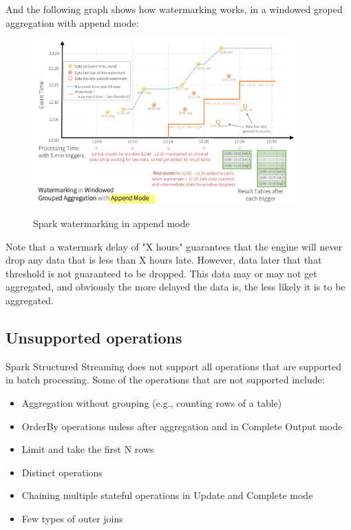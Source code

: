 And the following graph shows how watermarking works, in a windowed groped aggregation with append mode:

\begin{figure}[H]
    \centering
    \includegraphics[width=0.9\textwidth]{figures/spark_watermark_append.png}
    \label{fig:spark_watermark_append}
    \caption{Spark watermarking in append mode}
\end{figure}

Note that a watermark delay of "X hours" guarantees that the engine will never
drop any data that is less than X hours late. However, data later that that
threshold is not guaranteed to be dropped. This data may or may not get aggregated,
and obviously the more delayed the data is, the less likely it is to be aggregated.

\subsection{Unsupported operations}

Spark Structured Streaming does not support all operations that are supported in batch processing.
Some of the operations that are not supported include:

\begin{itemize}
    \item Aggregation without grouping (e.g., counting rows of a table)
    \item OrderBy operations unless after aggregation and in Complete Output mode
    \item Limit and take the first N rows
    \item Distinct operations
    \item Chaining multiple stateful operations in Update and Complete mode
    \item Few types of outer joins
\end{itemize}